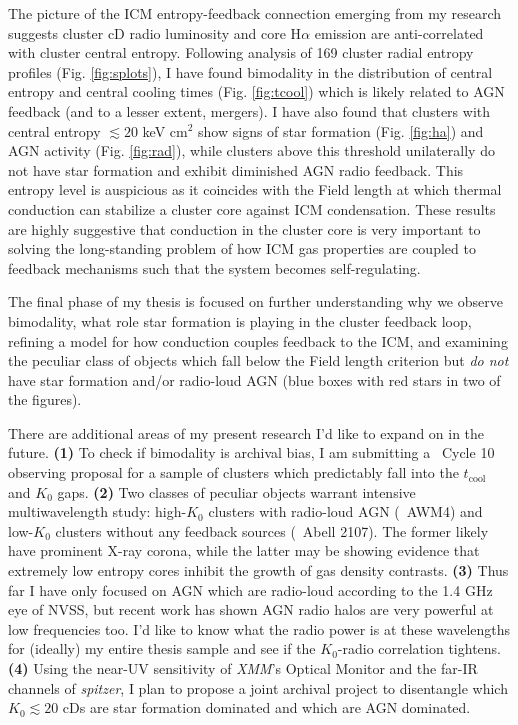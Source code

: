 \documentclass[11pt]{article}
\begin{document}
The picture of the ICM entropy-feedback connection emerging from my
research suggests cluster cD radio luminosity and core H$\alpha$
emission are anti-correlated with cluster central entropy. Following
analysis of 169 cluster radial entropy profiles
(Fig. \ref{fig:splots}), I have found bimodality in the distribution
of central entropy and central cooling times (Fig. \ref{fig:tcool})
which is likely related to AGN feedback (and to a lesser extent,
mergers). I have also found that clusters with central entropy
$\lesssim 20$ keV cm$^2$ show signs of star formation
(Fig. \ref{fig:ha}) and AGN activity (Fig. \ref{fig:rad}), while
clusters above this threshold unilaterally do not have star formation
and exhibit diminished AGN radio feedback. This entropy level is
auspicious as it coincides with the Field length at which thermal
conduction can stabilize a cluster core against ICM
condensation. These results are highly suggestive that conduction in
the cluster core is very important to solving the long-standing
problem of how ICM gas properties are coupled to feedback mechanisms
such that the system becomes self-regulating.

The final phase of my thesis is focused on further understanding why
we observe bimodality, what role star formation is playing in the cluster
feedback loop, refining a model for how conduction couples feedback to
the ICM, and examining the peculiar class of objects which fall below
the Field length criterion but {\it do not} have star formation and/or
radio-loud AGN (blue boxes with red stars in two of the figures).

There are additional areas of my present research I'd like to expand
on in the future. {\bf(1)} To check if bimodality is archival bias, I am
submitting a \chandra\ Cycle 10 observing proposal for a sample of
clusters which predictably fall into the $t_{\mathrm{cool}}$ and $K_0$
gaps. {\bf(2)} Two classes of peculiar objects warrant intensive
multiwavelength study: high-$K_0$ clusters with radio-loud AGN
(\eg\ AWM4) and low-$K_0$ clusters without any feedback sources
(\eg\ Abell 2107). The former likely have prominent X-ray corona,
while the latter may be showing evidence that extremely low entropy
cores inhibit the growth of gas density contrasts. {\bf(3)} Thus far I have
only focused on AGN which are radio-loud according to the 1.4 GHz eye
of NVSS, but recent work has shown AGN radio halos are very powerful
at low frequencies too. I'd like to know what the radio power is at
these wavelengths for (ideally) my entire thesis sample and see if the
$K_0$-radio correlation tightens. {\bf(4)} Using the near-UV sensitivity of
{\it XMM}'s Optical Monitor and the far-IR channels of {\it spitzer},
I plan to propose a joint archival project to disentangle which $K_0
\lesssim 20$ cDs are star formation dominated and which are AGN
dominated. 
\end{document}

